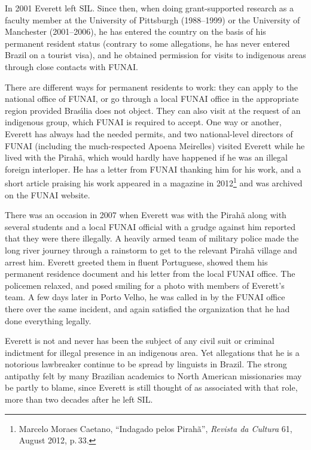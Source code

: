 \documentclass[output=paper,colorlinks,citecolor=brown
]{langscibook}
\begin{document}
In 2001 Everett left SIL. Since then, when doing grant-supported research
as a faculty member at the University of Pittsburgh (1988--1999) or
the University of Manchester (2001--2006), he has entered the country
on the basis of his permanent resident status (contrary to some
allegations, he has never entered Brazil on a tourist visa), and he
obtained permission for visits to indigenous areas through
close contacts with FUNAI.

There are different ways for permanent residents to work: they can apply
to the national office of FUNAI, or go through a local FUNAI office in
the appropriate region provided Bras{\'\i}lia does not object. They can
also visit at the request of an indigenous group, which FUNAI is required
to accept. One way or another, Everett has always had the needed permits,
and two national-level directors of FUNAI (including the much-respected
Apoena Meirelles) visited Everett while he lived with the Pirah{\~a},
which would hardly have happened if he was an illegal foreign
interloper. He has a letter from FUNAI thanking him for his work,
and a short article praising his work
appeared in a magazine in 2012\footnote{\label{caetano}
Marcelo Moraes Caetano, ``Indagado pelos Pirah{\~a}'', \textit{Revista
da Cultura} 61, August 2012, p.\,33.}
and was archived on the FUNAI website.

There was an occasion in 2007 when Everett was with the Pirah{\~a}
along with several students and a local FUNAI official with a grudge
against him reported that they were there illegally. A heavily armed
team of military police made the long river journey through a rainstorm
to get to the relevant Pirah{\~a} village and arrest him. Everett greeted
them in fluent Portuguese, showed them his permanent residence document
and his letter from the local FUNAI office. The policemen relaxed, and
posed smiling for a photo with members of Everett's team.
A few days later in Porto Velho, he was called in by the FUNAI office
there over the same incident, and again satisfied the organization that
he had done everything legally.

Everett is not and never has been the subject of any civil suit or
criminal indictment for illegal presence in an indigenous area. Yet
allegations that he is a notorious lawbreaker continue to be spread
by linguists in Brazil. The strong antipathy felt by many Brazilian
academics to North American missionaries may be partly to blame, since
Everett is still thought of as associated with that role, more than
two decades after he left SIL.
\end{document}
